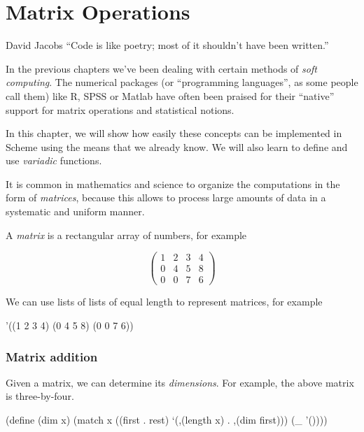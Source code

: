 
\chapter{Matrix Operations}

\begin{chapquote}{David Jacobs}
``Code is like poetry; most of it shouldn't have been written.''
\end{chapquote}

In the previous chapters we've been dealing with certain methods
of \textit{soft computing}. The numerical packages (or ``programming
languages'', as some people call them) like R, SPSS or Matlab
have often been praised for their ``native'' support for matrix
operations and statistical notions.

In this chapter, we will show how easily these concepts can be
implemented in Scheme using the means that we already know. We will
also learn to define and use \textit{variadic} functions.

It is common in mathematics and science to organize the computations
in the form of \textit{matrices}, because this allows to process
large amounts of data in a systematic and uniform manner.

A \textit{matrix} is a rectangular array of numbers, for example

\begin{equation*}
  \begin{pmatrix}
    1 & 2 & 3 & 4 \\
    0 & 4 & 5 & 8 \\
    0 & 0 & 7 & 6
  \end{pmatrix}
\end{equation*}

We can use lists of lists of equal length to represent matrices,
for example

\begin{Snippet}
'((1 2 3 4)
  (0 4 5 8)
  (0 0 7 6))
\end{Snippet}

\subsection{Matrix addition}

Given a matrix, we can determine its \textit{dimensions}.
For example, the above matrix is three-by-four.

\begin{Snippet}
(define (dim x)
  (match x
    ((first . rest)
     `(,(length x) . ,(dim first)))
    (_ 
     '())))
\end{Snippet}

